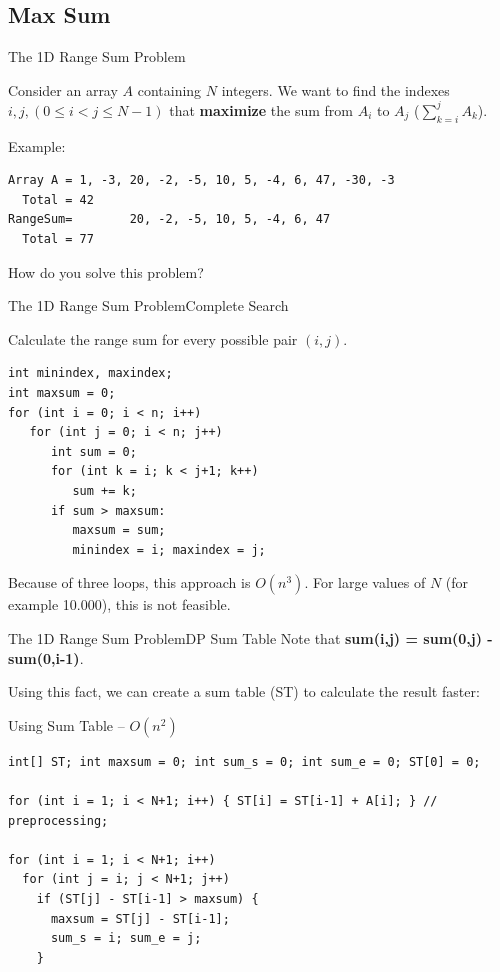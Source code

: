 \subsection{Max Sum}

\begin{frame}[fragile]{The 1D Range Sum Problem}

  Consider an array $A$ containing $N$ integers. We want to find the indexes $i,j, (0 \leq i < j \leq N-1)$ that {\bf maximize} the sum from $A_i$ to $A_j$ ($\sum_{k=i}^{j} A_k$).
  \bigskip

  Example:
\begin{verbatim}
Array A = 1, -3, 20, -2, -5, 10, 5, -4, 6, 47, -30, -3
  Total = 42
RangeSum=        20, -2, -5, 10, 5, -4, 6, 47
  Total = 77
\end{verbatim}
\bigskip

How do you solve this problem?
\end{frame}

\begin{frame}[fragile]{The 1D Range Sum Problem}{Complete Search}
  \begin{block}{    Calculate the range sum for every possible pair $(i,j)$.}

{\smaller
\begin{verbatim}
int minindex, maxindex;
int maxsum = 0;
for (int i = 0; i < n; i++)
   for (int j = 0; i < n; j++)
      int sum = 0;
      for (int k = i; k < j+1; k++)
         sum += k;
      if sum > maxsum:
         maxsum = sum;
         minindex = i; maxindex = j;
\end{verbatim}
}
  \end{block}

  Because of three loops, this approach is $O(n^3)$. For large values of $N$ (for example 10.000), this is not feasible.
\end{frame}

\begin{frame}[fragile]{The 1D Range Sum Problem}{DP Sum Table}
  Note that {\bf sum(i,j) = sum(0,j) - sum(0,i-1)}.\medskip

  Using this fact, we can create a sum table (ST) to calculate the result faster:

  \begin{block}{Using Sum Table -- $O(n^2)$}
{\smaller
\begin{verbatim}
int[] ST; int maxsum = 0; int sum_s = 0; int sum_e = 0; ST[0] = 0;

for (int i = 1; i < N+1; i++) { ST[i] = ST[i-1] + A[i]; } // preprocessing;

for (int i = 1; i < N+1; i++)
  for (int j = i; j < N+1; j++)
    if (ST[j] - ST[i-1] > maxsum) {
      maxsum = ST[j] - ST[i-1];
      sum_s = i; sum_e = j;
    }
\end{verbatim}
}
  \end{block}
\end{frame}

